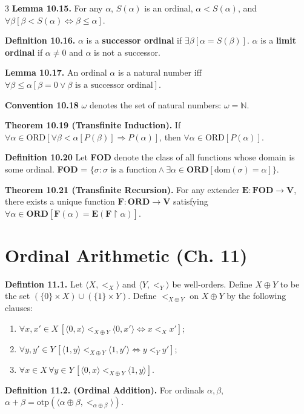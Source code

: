 \documentclass[landscape,8pt]{article}
\newcommand{\ot}{\text{otp}}
\renewcommand{\implies}{\Rightarrow}
\renewcommand{\iff}{\Leftrightarrow}
\begin{document}
\begin{multicols}{3}
	\noindent\textbf{Lemma 10.15.} For any $\alpha$, $S(\alpha)$ is an ordinal, $\alpha < S(\alpha)$, and $\forall \beta[\beta < S(\alpha) \iff \beta \leq \alpha]$.

	\noindent\textbf{Definition 10.16.} $\alpha$ is a \textbf{successor ordinal} if $\exists \beta[\alpha = S(\beta)]$. $\alpha$ is a \textbf{limit ordinal} if $\alpha \neq 0$ and $\alpha$ is not a successor.

	\noindent\textbf{Lemma 10.17.} An ordinal $\alpha$ is a natural number iff $\forall\beta\leq\alpha[\beta = 0 \lor \beta \textrm{ is a successor ordinal}]$.

	\noindent\textbf{Convention 10.18} $\omega$ denotes the set of natural numbers: $\omega = \mathbb{N}$.

	\noindent\textbf{Theorem 10.19 (Transfinite Induction).} If $\forall \alpha \in \text{ORD}[\forall \beta < \alpha[P(\beta)] \implies P(\alpha)]$, then $\forall \alpha \in \text{ORD}[P(\alpha)]$.

	\noindent\textbf{Definition 10.20} Let \textbf{FOD} denote the class of all functions whose domain is some ordinal. \textbf{FOD} = $\{\sigma :\sigma \textrm{ is a function} \land \exists\alpha\in\textbf{ORD}[\textrm{dom}(\sigma)=\alpha]\}$.

	\noindent\textbf{Theorem 10.21 (Transfinite Recursion).} For any extender $\textbf{E}: \textbf{FOD} \to \textbf{V}$, there exists a unique function $\textbf{F}: \textbf{ORD} \to \textbf{V}$ satisfying $\forall \alpha \in \textbf{ORD}[\textbf{F}(\alpha) = \textbf{E}(\textbf{F}\restriction\alpha)]$.

	\section*{\centering Ordinal Arithmetic (Ch. 11)}

	\noindent\textbf{Defintion 11.1.} Let $\langle X, <_X \rangle$ and $\langle Y, <_Y \rangle$ be well-orders. Define $X \oplus Y$ to be the set $(\{0\} \times X) \cup (\{1\} \times Y)$. Define $<_{X \oplus Y}$ on $X \oplus Y$ by the following clauses:
	\begin{enumerate}
		\item $\forall x, x' \in X \, [\langle 0, x \rangle <_{X \oplus Y} \langle 0, x' \rangle \Leftrightarrow x <_X x']$;
		\item $\forall y, y' \in Y \, [\langle 1, y \rangle <_{X \oplus Y} \langle 1, y' \rangle \Leftrightarrow y <_Y y']$;
		\item $\forall x \in X \, \forall y \in Y \, [\langle 0, x \rangle <_{X \oplus Y} \langle 1, y \rangle]$.
	\end{enumerate}
	\noindent\textbf{Definition 11.2. (Ordinal Addition).} For ordinals $\alpha, \beta$, $\alpha + \beta = \ot(\langle \alpha \oplus \beta, <_{\alpha \oplus \beta} \rangle)$.


\end{multicols}
\end{document}
